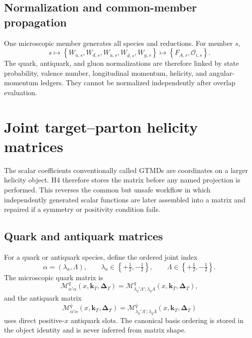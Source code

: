 \documentclass[11pt]{article}
\newcommand{\kT}{\bm{k}_{T}}
\newcommand{\DT}{\bm{\Delta}_{T}}
\newcommand{\cO}{\mathcal O}
\newcommand{\cM}{\mathcal M}
\begin{document}
\subsection{Normalization and common-member propagation}

One microscopic member generates all species and reductions.  For member
\(s\),
\begin{equation}
 s
 \longmapsto
 \left\{
 W_{u,s},W_{d,s},W_{\bar u,s},W_{\bar d,s},W_{g,s}
 \right\}
 \longmapsto
 \left\{
 F_{A,s},\cO_{i,s}
 \right\}.
 \label{eq:member-propagation}
\end{equation}
The quark, antiquark, and gluon normalizations are therefore linked by state
probability, valence number, longitudinal momentum, helicity, and angular-
momentum ledgers.  They cannot be normalized independently after overlap
evaluation.

\section{Joint target--parton helicity matrices}
\label{sec:helicity-matrices}

The scalar coefficients conventionally called GTMDs are coordinates on a
larger helicity object.  H4 therefore stores the matrix before any named
projection is performed.  This reverses the common but unsafe workflow in
which independently generated scalar functions are later assembled into a
matrix and repaired if a symmetry or positivity condition fails.

\subsection{Quark and antiquark matrices}

For a quark or antiquark species, define the ordered joint index
\begin{equation}
 \alpha=(\lambda_a,\Lambda),
 \qquad
 \lambda_a\in\left\{+\tfrac12,-\tfrac12\right\},
 \qquad
 \Lambda\in\left\{+\tfrac12,-\tfrac12\right\}.
\end{equation}
The microscopic quark matrix is
\begin{equation}
 \cM^{q}_{\alpha'\alpha}
 (x,\kT,\DT)
 =
 \cM^{q}_{\lambda_q'\Lambda';\lambda_q\Lambda}
 (x,\kT,\DT),
 \label{eq:quark-helicity-matrix}
\end{equation}
and the antiquark matrix
\begin{equation}
 \cM^{\bar q}_{\alpha'\alpha}
 (x,\kT,\DT)
 =
 \cM^{\bar q}_{\lambda_{\bar q}'\Lambda';
                  \lambda_{\bar q}\Lambda}
 (x,\kT,\DT)
 \label{eq:antiquark-helicity-matrix}
\end{equation}
uses direct positive-\(x\) antiquark slots.  The canonical basis ordering is
stored in the object identity and is never inferred from matrix shape.
\end{document}
